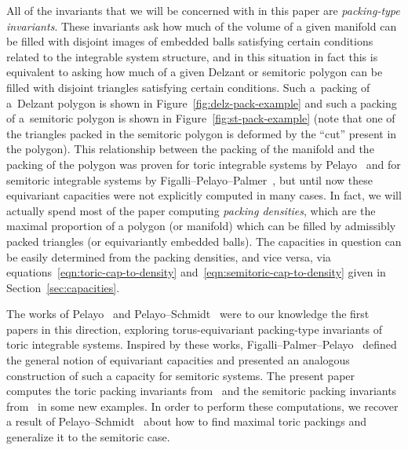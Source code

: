 \documentclass[10pt,a4paper]{amsart}
\numberwithin{equation}{section}
\theoremstyle{definition}
\theoremstyle{plain}
\theoremstyle{plain}
\begin{document}
All of the invariants that we will be concerned with in this paper are \emph{packing-type invariants}. These invariants ask how much of the volume of a given manifold can be filled with disjoint images of embedded balls satisfying certain conditions related to the integrable system structure, and in this situation in fact this is equivalent to asking how much of a given Delzant or semitoric polygon can be filled with disjoint triangles satisfying certain conditions.
Such
a~packing of a~Delzant polygon is shown in Figure~\ref{fig:delz-pack-example} and such a packing of a~semitoric polygon is shown in Figure~\ref{fig:st-pack-example} (note that one of the triangles packed in the semitoric polygon is deformed by the ``cut'' present in the polygon).
This relationship between the packing of the manifold and the packing of the polygon was proven for toric integrable systems by Pelayo~\cite{Pe2006} and for semitoric integrable systems by Figalli--Pelayo--Palmer~\cite{FiPaPe2016}, but until now these equivariant capacities were not explicitly computed in many cases.
In fact, we will actually spend most of the paper computing \emph{packing densities}, which are the maximal proportion of a polygon (or manifold) which can be filled by admissibly packed triangles (or equivariantly embedded balls).
The capacities in question can be easily determined from the packing densities, and vice versa, via equations~\eqref{eqn:toric-cap-to-density} and~\eqref{eqn:semitoric-cap-to-density} given in Section~\ref{sec:capacities}.

The works of Pelayo~\cite{Pe2006, Pe2007} and Pelayo--Schmidt~\cite{PeSc2008} were to our knowledge the first papers in this direction, exploring torus-equivariant packing-type invariants of toric integrable systems. Inspired by these works, Figalli--Palmer--Pelayo~\cite{FiPaPe2016} defined the general notion of equivariant capacities and presented an analogous construction of such a capacity for semitoric systems. The present paper computes the toric packing invariants from~\cite{Pe2006, Pe2007, PeSc2008} and the semitoric packing invariants from~\cite{FiPaPe2016} in some new examples.
In order to perform these computations, we recover a result of Pelayo--Schmidt~\cite{PeSc2008} about how to find maximal toric packings and generalize it to the semitoric case.
\end{document}
